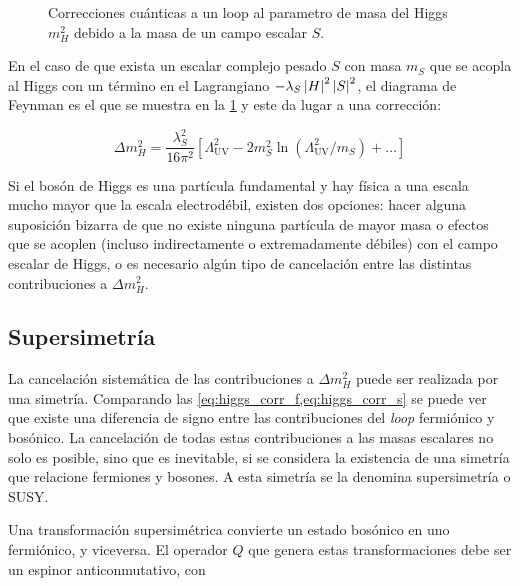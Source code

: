 \begin{figure}[!htbp]
  \centering 
  \caption{Correcciones cuánticas a un loop al parametro de masa del Higgs
    $m_H^2$ debido a la masa de un campo escalar $S$.}
  \label{fig:higgs_correction_s}
\end{figure}

En el caso de que exista un escalar complejo pesado $S$ con masa $m_S$ que se
acopla al Higgs con un término en el Lagrangiano $-\lambda_S \left| H \right|^2
\left| S \right|^2$, el diagrama de Feynman es el que se muestra en la
\cref{fig:higgs_correction_s} y este da lugar a una corrección:

\begin{equation}
  \Delta m_H^2 = \frac{\lambda_S^2}{16\pi^2} \left[ \Lambda^2_\text{UV} - 2
    m_S^2 \ln (\Lambda^2_\text{UV}/m_S) + \ldots \right]
  \label{eq:higgs_corr_s}
\end{equation}

Si el bosón de Higgs es una partícula fundamental y hay física a una escala
mucho mayor que la escala electrodébil, existen dos opciones: hacer
alguna suposición bizarra de que no existe ninguna partícula de mayor masa o
efectos que se acoplen (incluso indirectamente o extremadamente débiles) con el
campo escalar de Higgs, o es necesario algún tipo de cancelación entre las
distintas contribuciones a $\Delta m_H^2$.

\subsection{Supersimetría}

La cancelación sistemática de las contribuciones a $\Delta m_H^2$ puede ser
realizada por una simetría. Comparando las
\cref{eq:higgs_corr_f,eq:higgs_corr_s} se puede ver que existe una diferencia
de signo
entre las contribuciones del \emph{loop} fermiónico y bosónico. La cancelación de todas
estas contribuciones a las masas escalares no solo es posible, sino que es
inevitable, si se considera la existencia de una simetría que relacione fermiones y
bosones. A esta simetría se la denomina supersimetría o SUSY.

Una transformación supersimétrica convierte un estado bosónico en uno
fermiónico, y viceversa. El operador $Q$ que genera estas transformaciones debe
ser un espinor anticonmutativo, con


